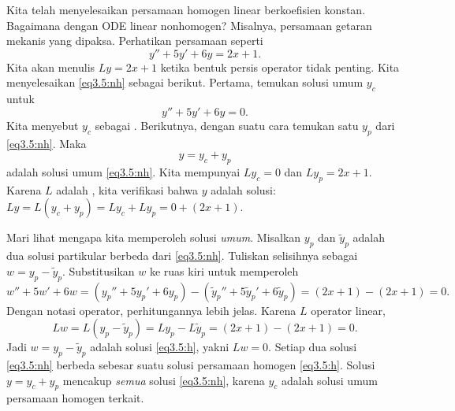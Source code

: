 Kita telah menyelesaikan persamaan homogen linear berkoefisien konstan. Bagaimana dengan ODE linear nonhomogen? Misalnya, persamaan getaran mekanis yang dipaksa.
Perhatikan persamaan seperti
\begin{equation} \label{eq3.5:nh}
y'' + 5y'+ 6y = 2x+1 .
\end{equation}
%
Kita akan menulis $Ly = 2x+1$ ketika bentuk persis operator tidak penting. Kita menyelesaikan \eqref{eq3.5:nh} sebagai berikut. Pertama, temukan solusi umum $y_c$ untuk \emph{}
\begin{equation} \label{eq3.5:h}
y'' + 5y'+ 6y = 0 .
\end{equation}
Kita menyebut $y_c$ sebagai \emph{}. Berikutnya, dengan suatu cara temukan satu \emph{} $y_p$ dari \eqref{eq3.5:nh}. Maka
\begin{equation*}
y = y_c + y_p
\end{equation*}
adalah solusi umum \eqref{eq3.5:nh}. Kita mempunyai $L y_c = 0$ dan $L y_p = 2x+1$. Karena $L$ adalah \emph{}, kita verifikasi bahwa $y$ adalah solusi: $L y = L ( y_c + y_p) = L y_c + L y_p = 0 + (2x+1)$.

Mari lihat mengapa kita memperoleh solusi \emph{umum}. Misalkan $y_p$ dan $\tilde{y}_p$ adalah dua solusi partikular berbeda dari \eqref{eq3.5:nh}. Tuliskan selisihnya sebagai $w = y_p - \tilde{y}_p$. Substitusikan $w$ ke ruas kiri untuk memperoleh
\begin{equation*}
w'' + 5w'+ 6w =
(y_p'' + 5y_p'+ 6y_p) -
(\tilde{y}_p'' + 5\tilde{y}_p'+ 6\tilde{y}_p) =
(2x+1) - (2x+1) = 0 .
\end{equation*}
Dengan notasi operator, perhitungannya lebih jelas.
Karena $L$ operator linear,
\begin{equation*}
Lw = L(y_p - \tilde{y}_p) =
Ly_p - L\tilde{y}_p =
(2x+1)-(2x+1) = 0 .
\end{equation*}
Jadi $w = y_p - \tilde{y}_p$ adalah solusi \eqref{eq3.5:h}, yakni $Lw = 0$. Setiap dua solusi \eqref{eq3.5:nh} berbeda sebesar suatu solusi persamaan homogen \eqref{eq3.5:h}. Solusi $y = y_c + y_p$ mencakup \emph{semua} solusi \eqref{eq3.5:nh}, karena $y_c$ adalah solusi umum persamaan homogen terkait.

